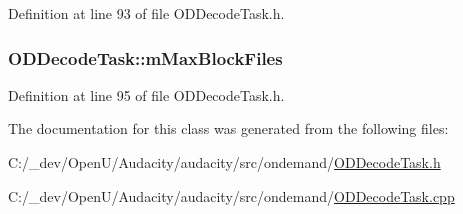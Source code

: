 Definition at line 93 of file O\+D\+Decode\+Task.\+h.

\subsubsection[{\texorpdfstring{m\+Max\+Block\+Files}{mMaxBlockFiles}}]{ O\+D\+Decode\+Task\+::m\+Max\+Block\+Files\hspace{0.3cm}{\ttfamily [protected]}}\hypertarget{class_o_d_decode_task_a9bbae0e983f08ee5a2185f6309b1c144}{}\label{class_o_d_decode_task_a9bbae0e983f08ee5a2185f6309b1c144}


Definition at line 95 of file O\+D\+Decode\+Task.\+h.



The documentation for this class was generated from the following files\+:\begin{DoxyCompactItemize}
\item 
C\+:/\+\_\+dev/\+Open\+U/\+Audacity/audacity/src/ondemand/\hyperlink{_o_d_decode_task_8h}{O\+D\+Decode\+Task.\+h}\item 
C\+:/\+\_\+dev/\+Open\+U/\+Audacity/audacity/src/ondemand/\hyperlink{_o_d_decode_task_8cpp}{O\+D\+Decode\+Task.\+cpp}\end{DoxyCompactItemize}

